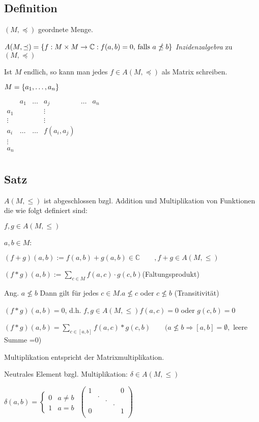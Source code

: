 	\subsection{Definition} %
	
	$(M, \preceq)$ geordnete Menge.
	
	$A(M, \preceq) = \left\{f : M \times M \to \operatorname{\mathbb{C}} : f(a, b) = 0 \text{, falls } a \npreceq b\right\}$ 
	\emph{Inzidenzalgebra} zu $(M, \preceq)$
	
	Ist $M$ endlich, so kann man jedes $f \in A(M, \preceq)$ als Matrix schreiben.
	
	$M = \left\{a_1, \dots, a_n\right\}$
	
	$\begin{array}{c|ccccc}
			& a_1	& \dots & a_j 	& \dots & a_n \\\hline
	a_1  	&		&		&\vdots	\\
	\vdots  &		&		&\vdots \\
	a_i		&\dots 	& \dots & f(a_i, a_j) \\
	\vdots  & \\
	a_n		& \\
	\end{array}$

\subsection{Satz}
$A(M,\leq)$ ist abgeschlossen bzgl. Addition und Multiplikation von Funktionen die wie folgt definiert sind:

$ f,g\in A(M,\leq)$

$a,b \in M$:

$(f+g)(a,b):= f(a,b)+g(a,b) \in \mathbb{C} \qquad ,f+g \in A(M,\leq)$

$(f*g)(a,b):= \sum_{c\in M}f(a,c)\cdot g(c,b) $\qquad (Faltungsprodukt)

Ang. $a \nleq b$ Dann gilt für jedes $c \in M. a \nleq c$ oder $c\nleq b$ (Transitivität)

$(f*g)(a,b)=0$, d.h. $f,g\in A(M,\leq)f(a,c)=0 $ oder $g(c,b)=0$

$(f*g)(a,b) = \sum_{c\in [a,b]}f(a,c)*g(c,b) \qquad(a \nleq b \Rightarrow [a,b] = \emptyset,$ leere Summe =0)

Multiplikation entspricht der Matrixmultiplikation.

Neutrales Element bzgl. Multiplikation: $\delta \in A(M,\leq)$

$\delta(a,b)=\begin{cases}
0 & a\neq b\\
1 & a=b
\end{cases}$ \qquad $\begin{pmatrix}
1 & & & & 0\\
&. & & & \\
& &. & & \\
& & &. & \\
0 & & & &1 \\
\end{pmatrix}
$


